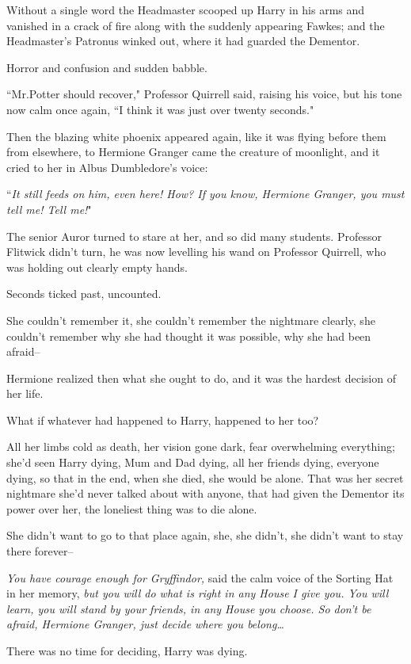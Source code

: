 Without a single word the Headmaster scooped up Harry in his arms and vanished in a crack of fire along with the suddenly appearing Fawkes; and the Headmaster's Patronus winked out, where it had guarded the Dementor.

Horror and confusion and sudden babble.

``Mr.\?Potter should recover," Professor Quirrell said, raising his voice, but his tone now calm once again, ``I think it was just over twenty seconds."

Then the blazing white phoenix appeared again, like it was flying before them from elsewhere, to Hermione Granger came the creature of moonlight, and it cried to her in Albus Dumbledore's voice:

``\emph{It still feeds on him, even here! How? If you know, Hermione Granger, you must tell me! Tell me!}"

The senior Auror turned to stare at her, and so did many students. Professor Flitwick didn't turn, he was now levelling his wand on Professor Quirrell, who was holding out clearly empty hands.

Seconds ticked past, uncounted.

She couldn't remember it, she couldn't remember the nightmare clearly, she couldn't remember why she had thought it was possible, why she had been afraid\---

Hermione realized then what she ought to do, and it was the hardest decision of her life.

What if whatever had happened to Harry, happened to her too?

All her limbs cold as death, her vision gone dark, fear overwhelming everything; she'd seen Harry dying, Mum and Dad dying, all her friends dying, everyone dying, so that in the end, when she died, she would be alone. That was her secret nightmare she'd never talked about with anyone, that had given the Dementor its power over her, the loneliest thing was to die alone.

She didn't want to go to that place again, she, she didn't, she didn't want to stay there forever\---

\emph{You have courage enough for Gryffindor,} said the calm voice of the Sorting Hat in her memory, \emph{but you will do what is right in any House I give you. You will learn, you will stand by your friends, in any House you choose. So don't be afraid, Hermione Granger, just decide where you belong{\ldots}}

There was no time for deciding, Harry was dying.

